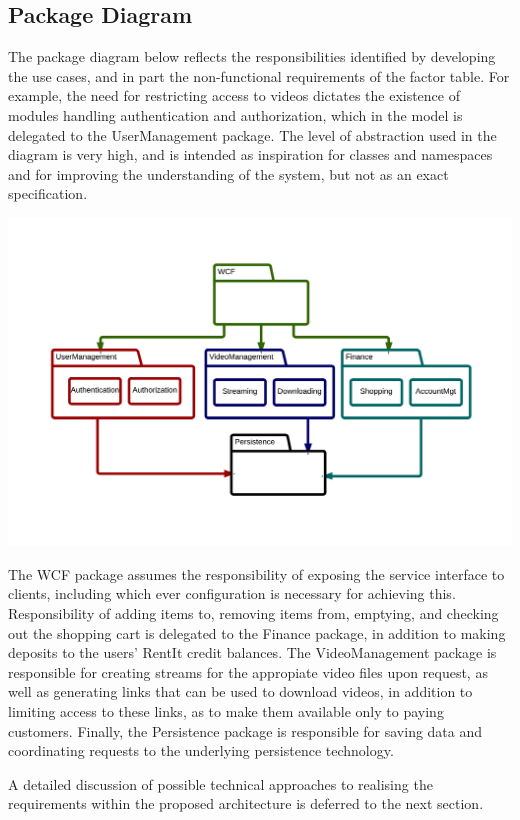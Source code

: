 \subsection{Package Diagram}
The package diagram below reflects the responsibilities identified by developing the use cases, and in part the non-functional requirements of the factor table. For example, the need for restricting access to videos dictates the existence of modules handling authentication and authorization, which in the model is delegated to the UserManagement package. The level of abstraction used in the diagram is very high, and is intended as inspiration for classes and namespaces and for improving the understanding of the system, but not as an exact specification.
\begin{center}
\includegraphics[scale=0.15]{PackageDiagram.png}
\end{center}

The WCF package assumes the responsibility of exposing the service interface to clients, including which ever configuration is necessary for achieving this. Responsibility of adding items to, removing items from, emptying, and checking out the shopping cart is delegated to the Finance package, in addition to making deposits to the users' RentIt credit balances.
The VideoManagement package is responsible for creating streams for the appropiate video files upon request, as well as generating links that can be used to download videos, in addition to limiting access to these links, as to make them available only to paying customers. Finally, the Persistence package is responsible for saving data and coordinating requests to the underlying persistence technology.

A detailed discussion of possible technical approaches to realising the requirements within the proposed architecture is deferred to the next section.


